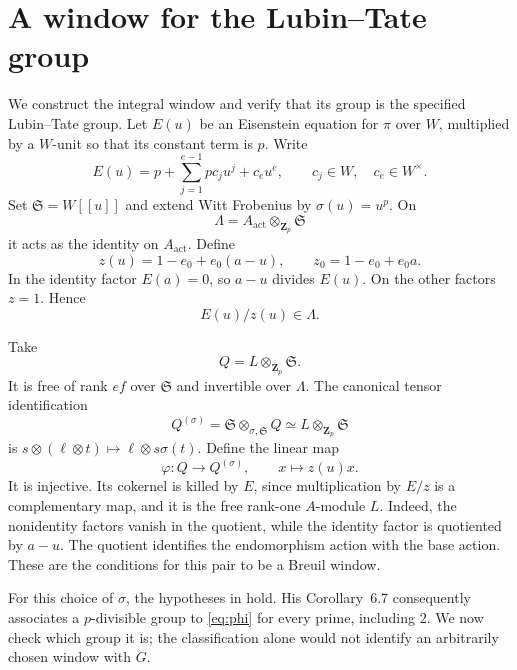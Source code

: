 \documentclass[11pt]{article}
\theoremstyle{definition}\newtheorem{definition}[theorem]{Definition}
\theoremstyle{remark}\newtheorem{remark}[theorem]{Remark}
\newcommand{\ZZ}{\mathbf Z}
\newcommand{\act}{\mathrm{act}}
\begin{document}
\section{A window for the Lubin--Tate group}\label{sec:window}

We construct the integral window and verify that its group is the specified Lubin--Tate group. Let $E(u)$ be an Eisenstein equation for $\pi$ over $W$, multiplied by a $W$-unit so that its constant term is $p$. Write
\begin{equation}\label{eq:E}
 E(u)=p+\sum_{j=1}^{e-1}pc_j u^j+c_eu^e,
 \qquad c_j\in W,\quad c_e\in W^\times.
\end{equation}
Set $\mathfrak S=W[[u]]$ and extend Witt Frobenius by $\sigma(u)=u^p$. On
\[
 \Lambda=A_{\act}\otimes_{\ZZ_p}\mathfrak S
\]
it acts as the identity on $A_{\act}$. Define
\begin{equation}\label{eq:z}
 z(u)=1-e_0+e_0(a-u),\qquad z_0=1-e_0+e_0a.
\end{equation}
In the identity factor $E(a)=0$, so $a-u$ divides $E(u)$. On the other factors $z=1$. Hence
\begin{equation}\label{eq:Eoverz}
 E(u)/z(u)\in\Lambda.
\end{equation}

Take
\[
 Q=L\otimes_{\ZZ_p}\mathfrak S.
\]
It is free of rank $ef$ over $\mathfrak S$ and invertible over $\Lambda$. The canonical tensor identification
\[
 Q^{(\sigma)}=\mathfrak S\otimes_{\sigma,\mathfrak S}Q
       \simeq L\otimes_{\ZZ_p}\mathfrak S
\]
is $s\otimes(\ell\otimes t)\mapsto\ell\otimes s\sigma(t)$. Define the linear map
\begin{equation}\label{eq:phi}
 \varphi:Q\longrightarrow Q^{(\sigma)},\qquad x\longmapsto z(u)x.
\end{equation}
It is injective. Its cokernel is killed by $E$, since multiplication by $E/z$ is a complementary map, and it is the free rank-one $A$-module $L$. Indeed, the nonidentity factors vanish in the quotient, while the identity factor is quotiented by $a-u$. The quotient identifies the endomorphism action with the base action. These are the conditions for this pair to be a Breuil window.

For this choice of $\sigma$, the hypotheses in \citet[Remark~6.3]{Lau} hold. His Corollary~6.7 consequently associates a $p$-divisible group to \eqref{eq:phi} for every prime, including $2$. We now check which group it is; the classification alone would not identify an arbitrarily chosen window with $G$.
\end{document}
